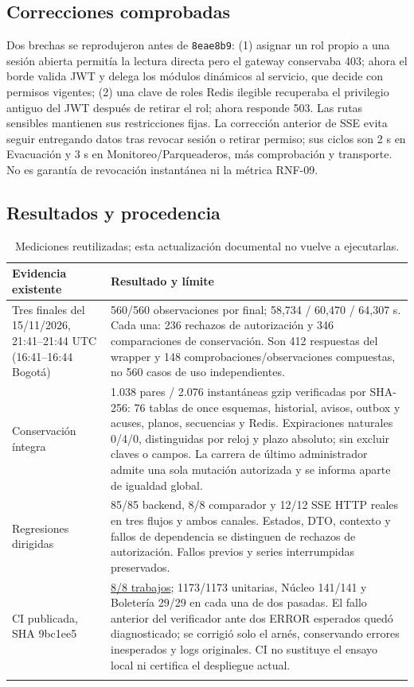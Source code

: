 \subsection{Correcciones comprobadas}
Dos brechas se reprodujeron antes de \texttt{8eae8b9}: (1) asignar un rol propio
a una sesión abierta permitía la lectura directa pero el gateway conservaba 403;
ahora el borde valida JWT y delega los módulos dinámicos al servicio, que decide
con permisos vigentes; (2) una clave de roles Redis ilegible recuperaba el
privilegio antiguo del JWT después de retirar el rol; ahora responde 503. Las
rutas sensibles mantienen sus restricciones fijas. La corrección anterior de
SSE evita seguir entregando datos tras revocar sesión o retirar permiso; sus
ciclos son 2 s en Evacuación y 3 s en Monitoreo/Parqueaderos, más comprobación y
transporte. No es garantía de revocación instantánea ni la métrica RNF-09.

\subsection{Resultados y procedencia}
\begin{center}
\begin{longtable}{P{4.1cm}P{9.5cm}}
\toprule\textbf{Evidencia existente} & \textbf{Resultado y límite}\\\midrule\endhead
Tres finales del 15/11/2026, 21:41--21:44 UTC (16:41--16:44 Bogotá) &
560/560 observaciones por final; 58,734 / 60,470 / 64,307 s. Cada una: 236
rechazos de autorización y 346 comparaciones de conservación. Son 412
respuestas del wrapper y 148 comprobaciones/observaciones compuestas, no 560
casos de uso independientes.\\\midrule
Conservación íntegra & 1.038 pares / 2.076 instantáneas gzip verificadas por
SHA-256: 76 tablas de once esquemas, historial, avisos, outbox y acuses, planos,
secuencias y Redis. Expiraciones naturales 0/4/0, distinguidas por reloj y plazo
absoluto; sin excluir claves o campos. La carrera de último administrador admite
una sola mutación autorizada y se informa aparte de igualdad global.\\\midrule
Regresiones dirigidas & 85/85 backend, 8/8 comparador y 12/12 SSE HTTP reales
en tres flujos y ambos canales. Estados, DTO, contexto y fallos de dependencia
se distinguen de rechazos de autorización. Fallos previos y series
interrumpidas preservados.\\\midrule
CI publicada, SHA 9bc1ee5 &
\href{https://github.com/Emperador24/HEXACORE/actions/runs/43768177312}{8/8 trabajos};
1173/1173 unitarias, Núcleo 141/141 y Boletería 29/29 en cada una de dos
pasadas. El fallo anterior del verificador ante dos ERROR esperados quedó
diagnosticado; se corrigió solo el arnés, conservando errores inesperados y logs
originales. CI no sustituye el ensayo local ni certifica el despliegue actual.\\
\bottomrule\caption{Mediciones reutilizadas; esta actualización documental no vuelve a ejecutarlas.}
\end{longtable}\end{center}

